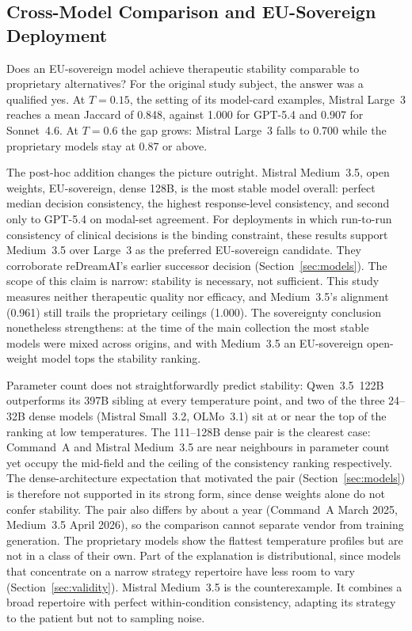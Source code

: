 \subsection{Cross-Model Comparison and EU-Sovereign Deployment}
\label{sec:sovereign-deployment}

Does an EU-sovereign model achieve therapeutic stability comparable to proprietary alternatives? For the original study subject, the answer was a qualified yes. At $T{=}0.15$, the setting of its model-card examples, Mistral Large~3 reaches a mean Jaccard of 0.848, against 1.000 for GPT-5.4 and 0.907 for Sonnet~4.6. At $T{=}0.6$ the gap grows: Mistral Large~3 falls to 0.700 while the proprietary models stay at 0.87 or above.

The post-hoc addition changes the picture outright. Mistral Medium~3.5, open weights, EU-sovereign, dense 128B, is the most stable model overall: perfect median decision consistency, the highest response-level consistency, and second only to GPT-5.4 on modal-set agreement. For deployments in which run-to-run consistency of clinical decisions is the binding constraint, these results support Medium~3.5 over Large~3 as the preferred EU-sovereign candidate. They corroborate reDreamAI's earlier successor decision (Section~\ref{sec:models}). The scope of this claim is narrow: stability is necessary, not sufficient. This study measures neither therapeutic quality nor efficacy, and Medium~3.5's alignment (0.961) still trails the proprietary ceilings (1.000). The sovereignty conclusion nonetheless strengthens: at the time of the main collection the most stable models were mixed across origins, and with Medium~3.5 an EU-sovereign open-weight model tops the stability ranking.

Parameter count does not straightforwardly predict stability: Qwen~3.5~122B outperforms its 397B sibling at every temperature point, and two of the three 24--32B dense models (Mistral Small~3.2, OLMo~3.1) sit at or near the top of the ranking at low temperatures. The 111--128B dense pair is the clearest case: Command~A and Mistral Medium~3.5 are near neighbours in parameter count yet occupy the mid-field and the ceiling of the consistency ranking respectively. The dense-architecture expectation that motivated the pair (Section~\ref{sec:models}) is therefore not supported in its strong form, since dense weights alone do not confer stability. The pair also differs by about a year (Command~A March 2025, Medium~3.5 April 2026), so the comparison cannot separate vendor from training generation. The proprietary models show the flattest temperature profiles but are not in a class of their own. Part of the explanation is distributional, since models that concentrate on a narrow strategy repertoire have less room to vary (Section~\ref{sec:validity}). Mistral Medium~3.5 is the counterexample. It combines a broad repertoire with perfect within-condition consistency, adapting its strategy to the patient but not to sampling noise.

